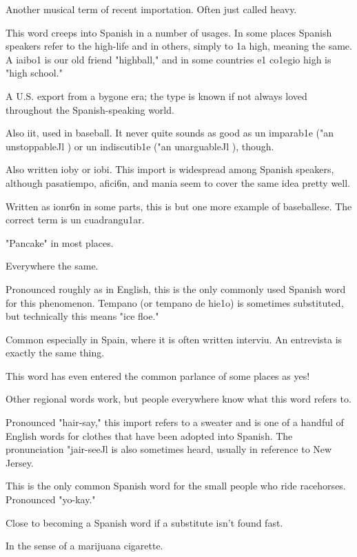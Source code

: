  Another musical term of recent importation.
Often just called heavy.

 This word creeps into Spanish in a number of usages.
In some places Spanish speakers refer to the high-life and in others,
simply to 1a high, meaning the same. A iaibo1 is our old friend "highball," and in some countries e1 co1egio high is "high school."

 A U.S. export from a bygone era; the type is known if
not always loved throughout the Spanish-speaking world.

 Also iit, used in baseball. It never quite sounds as good as
un imparab1e ("an unstoppableJl ) or un indiscutib1e ("an unarguableJl ),
though.

 Also written ioby or iobi. This import is widespread
among Spanish speakers, although pasatiempo, afici6n, and mania
seem to cover the same idea pretty well.

 Written as ionr6n in some parts, this is but one
more example of baseballese. The correct term is un cuadrangu1ar.

 "Pancake" in most places.

 Everywhere the same.

 Pronounced roughly as in English, this is the only
commonly used Spanish word for this phenomenon. Tempano (or tempano de hie1o) is sometimes substituted, but technically this means
"ice floe."

 Common especially in Spain, where it is often
written interviu. An entrevista is exactly the same thing.

 This word has even entered the common parlance of
some places as yes!

 Other regional words work, but people everywhere
know what this word refers to.

 Pronounced "hair-say," this import refers to a
sweater and is one of a handful of English words for clothes that
have been adopted into Spanish. The pronunciation "jair-seeJl is also
sometimes heard, usually in reference to New Jersey.

 This is the only common Spanish word for the
small people who ride racehorses. Pronounced "yo-kay."

 Close to becoming a Spanish word if a substitute
isn't found fast.

 In the sense of a marijuana cigarette.

